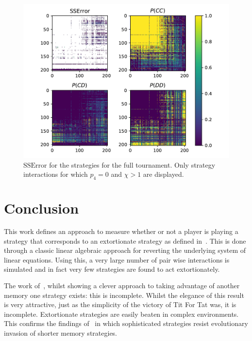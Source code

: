 \documentclass[a4paper]{article}
\begin{document}
\begin{figure}[!htbp]
    \centering
    \includegraphics[width=.8\textwidth]{./assets/img/SSError_and_probabilities_in_full/main.pdf}
    \caption{\(\text{SSError}\) for the strategies for the full tournament. Only
    strategy interactions for which \(p_4=0\) and \(\chi>1\) are displayed.}
    \label{fig:SSError_and_probabilities_in_full}
\end{figure}


\section{Conclusion}\label{sec:conclusion}

This work defines an approach to measure whether or not a player is playing a
strategy that corresponds to an extortionate strategy as defined
in~\cite{Press2012}. This is done through a classic linear algebraic approach
for reverting the underlying system of linear equations. Using this, a very
large number of pair wise interactions is simulated and in fact very few
strategies are found to act extortionately.

The work of~\cite{Press2012}, whilst showing a clever approach to taking
advantage of another memory one strategy exists: this is incomplete. Whilst the
elegance of this result is very attractive, just as the simplicity of the
victory of Tit For Tat was, it is incomplete. Extortionate strategies are easily
beaten in complex environments. This confirms the findings of~\cite{Moran1707}
in which sophisticated strategies resist evolutionary invasion of shorter memory
strategies.


\printbibliography
\end{document}
